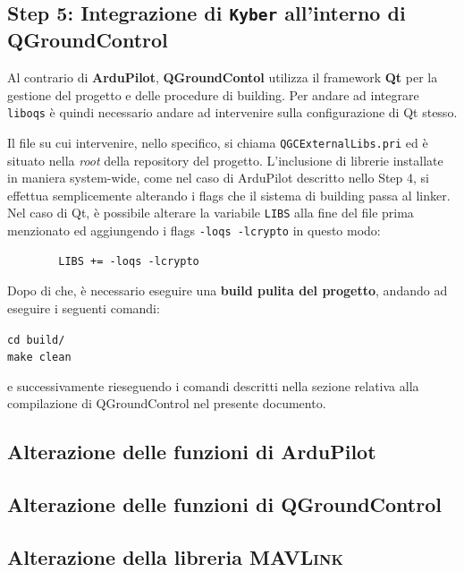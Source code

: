 \documentclass[a4paper, 12pt, oneside]{article}
\theoremstyle{definition}
\begin{document}
\newpage
\subsection{Step 5: Integrazione di \texttt{Kyber} all'interno di QGroundControl}

Al contrario di \textbf{ArduPilot}, \textbf{QGroundContol} utilizza il framework \textbf{Qt} per la gestione del progetto e delle procedure di building. Per andare ad integrare \texttt{liboqs} è quindi necessario andare ad intervenire sulla configurazione di Qt stesso. 

Il file su cui intervenire, nello specifico, si chiama \texttt{QGCExternalLibs.pri} ed è situato nella \textit{root} della repository del progetto. L'inclusione di librerie installate in maniera system-wide, come nel caso di ArduPilot descritto nello Step 4, si effettua semplicemente alterando i flags che il sistema di building passa al linker. Nel caso di Qt, è possibile alterare la variabile \texttt{LIBS} alla fine del file prima menzionato ed aggiungendo i flags \texttt{-loqs -lcrypto} in questo modo:

    \begin{verbatim}
        LIBS += -loqs -lcrypto
    \end{verbatim}

Dopo di che, è necessario eseguire una \textbf{build pulita del progetto}, andando ad eseguire i seguenti comandi:

\begin{center}
    \texttt{cd build/} \\
    \texttt{make clean}
\end{center}

e successivamente rieseguendo i comandi descritti nella sezione relativa alla compilazione di QGroundControl nel presente documento.

\newpage
\subsection{Alterazione delle funzioni di \textbf{ArduPilot}}
\newpage
\subsection{Alterazione delle funzioni di \textbf{QGroundControl}}
\newpage
\subsection{Alterazione della libreria \textsc{MAVLink}}

\newpage
\printbibliography[title={Riferimenti bibliografici e risorse consultate}]
\end{document}

